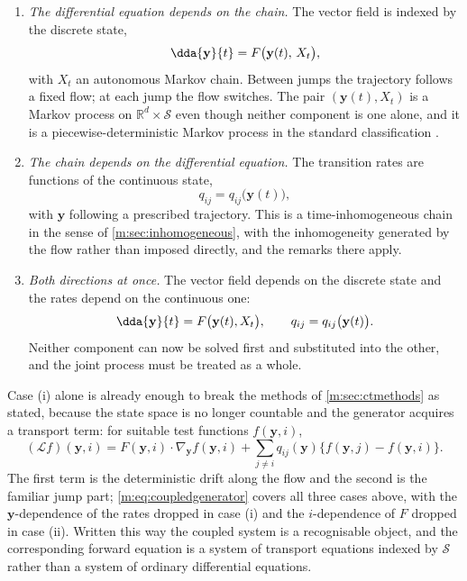 \begin{enumerate}[label=(\roman*),leftmargin=*]
\item \emph{The differential equation depends on the chain.} The vector field is
      indexed by the discrete state,
      \begin{equation}
      \label{m:eq:coupledone}
      \dda{\mathbf y}{t} = F\bigl(\mathbf y(t),\,X_t\bigr),
      \end{equation}
      with $X_t$ an autonomous Markov chain. Between jumps the trajectory follows a
      fixed flow; at each jump the flow switches. The pair
      $(\mathbf y(t),X_t)$ is a Markov process on $\mathbb R^d\times\mathcal S$ even
      though neither component is one alone, and it is a piecewise-deterministic
      Markov process in the standard classification \cite{Davis1993}.
\item \emph{The chain depends on the differential equation.} The transition rates
      are functions of the continuous state,
      \begin{equation}
      \label{m:eq:coupledtwo}
      q_{ij} = q_{ij}\bigl(\mathbf y(t)\bigr),
      \end{equation}
      with $\mathbf y$ following a prescribed trajectory. This is a
      time-inhomogeneous chain in the sense of \cref{m:sec:inhomogeneous}, with the
      inhomogeneity generated by the flow rather than imposed directly, and the
      remarks there apply.
\item \emph{Both directions at once.} The vector field depends on the discrete
      state and the rates depend on the continuous one:
      \begin{equation}
      \label{m:eq:coupledthree}
      \dda{\mathbf y}{t} = F\bigl(\mathbf y(t),X_t\bigr),
      \qquad
      q_{ij} = q_{ij}\bigl(\mathbf y(t)\bigr) .
      \end{equation}
      Neither component can now be solved first and substituted into the other, and
      the joint process must be treated as a whole.
\end{enumerate}

Case (i) alone is already enough to break the methods of \cref{m:sec:ctmethods} as
stated, because the state space is no longer countable and the generator acquires a
transport term: for suitable test functions $f(\mathbf y,i)$,
\begin{equation}
\label{m:eq:coupledgenerator}
(\mathcal Lf)(\mathbf y,i)
= F(\mathbf y,i)\cdot\nabla_{\mathbf y}f(\mathbf y,i)
+ \sum_{j\neq i}q_{ij}(\mathbf y)\bigl\{f(\mathbf y,j)-f(\mathbf y,i)\bigr\} .
\end{equation}
The first term is the deterministic drift along the flow and the second is the
familiar jump part; \cref{m:eq:coupledgenerator} covers all three cases above,
with the $\mathbf y$-dependence of the rates dropped in case (i) and the
$i$-dependence of $F$ dropped in case (ii). Written this way the coupled system is
a recognisable object, and the corresponding forward equation is a system of
transport equations indexed by $\mathcal S$ rather than a system of ordinary
differential equations.

